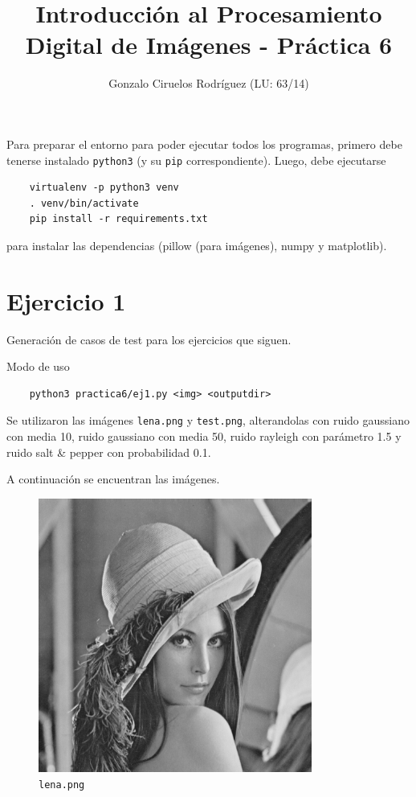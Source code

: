 \documentclass[11pt, spanish]{article}
\title{Introducción al Procesamiento Digital de Imágenes - Práctica 6}
\date{}
\author{Gonzalo Ciruelos Rodríguez (LU: 63/14)}
\begin{document}
\maketitle

Para preparar el entorno para poder ejecutar todos los programas,
primero debe tenerse instalado \texttt{python3} (y su \texttt{pip} correspondiente).
Luego, debe ejecutarse 
\begin{verbatim}
    virtualenv -p python3 venv 
    . venv/bin/activate
    pip install -r requirements.txt 
\end{verbatim}

\noindent para instalar las dependencias (pillow (para imágenes), numpy y matplotlib).



\section{Ejercicio 1}

Generación de casos de test para los ejercicios que siguen.

Modo de uso
\begin{verbatim}
    python3 practica6/ej1.py <img> <outputdir>
\end{verbatim}

Se utilizaron las imágenes \texttt{lena.png} y \texttt{test.png}, alterandolas con ruido gaussiano con media 10, ruido
gaussiano con media 50, ruido rayleigh con parámetro 1.5 y ruido salt \& pepper con probabilidad 0.1.

A continuación se encuentran las imágenes.

\begin{figure}[H]
\centering
  \includegraphics[height=9cm]{ej1-imgs/lena-original.png}
  \caption{\texttt{lena.png}}
\end{figure}
\end{document}
